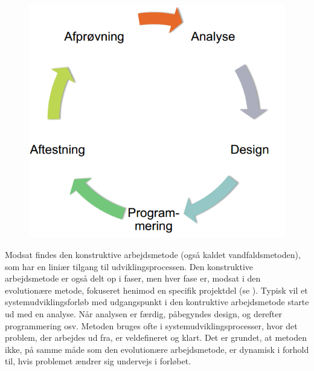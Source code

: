 \begin{figure}[ht]
	\centering
	\includegraphics[scale=0.5]{billeder/evolutionaeremetode.png}
	\label{fig:evolutionaeremetode}
  \end{figure}

Modsat findes den konstruktive arbejdsmetode (også kaldet vandfaldsmetoden), som har en liniær tilgang til udviklingsprocessen. Den konstruktive arbejdsmetode er også delt op i faser, men hver fase er, modsat i den evolutionære metode, fokuseret henimod en specifik projektdel (se ). Typisk vil et systemudviklingsforløb med udgangspunkt i den kontruktive arbejdsmetode starte ud med en analyse. Når analysen er færdig, påbegyndes design, og derefter programmering osv. Metoden bruges ofte i systemudviklingsprocesser, hvor det problem, der arbejdes ud fra, er veldefineret og klart. Det er grundet, at metoden ikke, på samme måde som den evolutionære arbejdsmetode, er dynamisk i forhold til, hvis problemet ændrer sig undervejs i forløbet.

